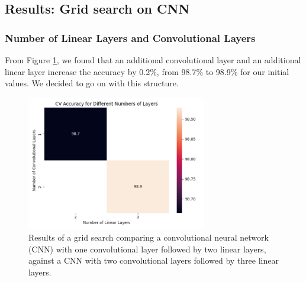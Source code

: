 \newpage
\subsection{Results: Grid search on CNN}
\subsubsection{Number of Linear Layers and Convolutional Layers}
From Figure \ref{fig:cnn:layers}, we found that an additional convolutional layer and an additional linear layer increase the accuracy by 0.2\%, from 98.7\% to 98.9\% for our initial values. We decided to go on with this structure.
\begin{figure}[H]
    \centering
    \includegraphics[width=0.7\textwidth]{results/cnn_grid_search/heatmap_grid_search_layers.png}
    \caption{Results of a grid search comparing a convolutional neural network (CNN) with one convolutional layer followed by two linear layers, against a CNN with two convolutional layers followed by three linear layers.}
    \label{fig:cnn:layers}
\end{figure}

\newpage
